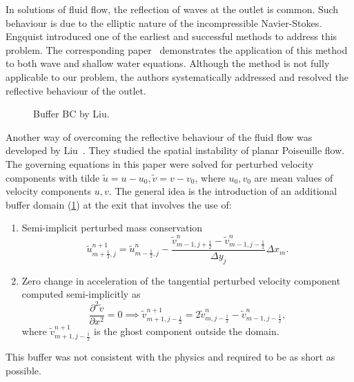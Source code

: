 \documentclass{article}
\begin{document}
In solutions of fluid flow, the reflection of waves at the outlet is common. Such behaviour is due to the elliptic nature of the incompressible Navier-Stokes. Engquist introduced one of the earliest and successful methods to address this problem. The corresponding paper~\cite{Engquist:1977} demonstrates the application of this method to both wave and shallow water equations. Although the method is not fully applicable to our problem, the authors systematically addressed and resolved the reflective behaviour of the outlet.
\begin{figure}[H] %
  \caption{Buffer BC by Liu.}\label{fig:BC-buffer}
\end{figure}
Another way of overcoming the reflective behaviour of the fluid flow was developed by Liu~\cite{Liu:1993}. They studied the spatial instability of planar Poiseuille flow. The governing equations in this paper were solved for perturbed velocity components with tilde $\tilde{u}=u-u_0,\tilde{v}=v-v_0$, where $u_0,v_0$ are mean values of velocity components $u,v$. The general idea is the introduction of an additional buffer domain (\cref{fig:BC-buffer}) at the exit that involves the use of:
\begin{enumerate}
	\item Semi-implicit perturbed mass conservation
	\begin{equation*}
		\tilde{u}_{m+\frac{1}{2},j}^{n+1}=\tilde{u}_{m-\frac{1}{2},j}^n-\frac{\tilde{v}^n_{m-1,j+\frac{1}{2}}-\tilde{v}^n_{m-1,j-\frac{1}{2}}}{\Delta y_{j}}{\Delta x_m}.
	\end{equation*}
	\item Zero change in acceleration of the tangential perturbed velocity component computed semi-implicitly as
	\begin{equation*}
		\frac{\partial ^2 \tilde{v}}{\partial x^2}=0\implies \tilde{v}^{n+1}_{m+1,j-\frac{1}{2}}=2\tilde{v}^n_{m,j-\frac{1}{2}}-\tilde{v}^n_{m-1,j-\frac{1}{2}},
	\end{equation*}
	where $\tilde{v}^{n+1}_{m+1,j-\frac{1}{2}}$ is the ghost component outside the domain.
\end{enumerate}
This buffer was not consistent with the physics and required to be as short as possible. 
\end{document}
